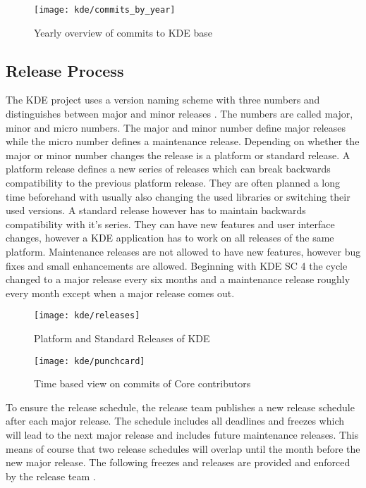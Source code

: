 \begin{figure}[htbp]
  \centering
  \texttt{[image: kde/commits\_by\_year]}
  \caption{Yearly overview of commits to KDE base}
\end{figure}


\subsection{Release Process} %

The KDE project uses a version naming scheme with three numbers and
distinguishes between major and minor releases
\cite{KDEReleaseTeam,KDEReleaseSchedule,KDESchedule}. The numbers are called
major, minor and micro numbers. The major and minor number define major
releases while the micro number defines a maintenance release. Depending on
whether the major or minor number changes the release is a platform or standard
release. A platform release defines a new series of releases which can break
backwards compatibility to the previous platform release. They are often
planned a long time beforehand with usually also changing the used libraries or
switching their used versions. A standard release however has to maintain
backwards compatibility with it's series. They can have new features and user
interface changes, however a KDE application has to work on all releases of the
same platform. Maintenance releases are not allowed to have new features,
however bug fixes and small enhancements are allowed. Beginning with \ac{KDE
SC} 4 the cycle changed to a major release every six months and a maintenance
release roughly every month except when a major release comes out.

\begin{figure}[htbp]
  \centering
  \texttt{[image: kde/releases]}
  \caption{Platform and Standard Releases of KDE}
\end{figure}

\begin{figure}[htbp]
  \centering
  \texttt{[image: kde/punchcard]}
  \caption{Time based view on commits of Core contributors}
\end{figure}

To ensure the release schedule, the release team publishes a new release
schedule after each major release. The schedule includes all deadlines and
freezes which will lead to the next major release and includes future
maintenance releases. This means of course that two release schedules will
overlap until the month before the new major release. The following freezes and
releases are provided and enforced by the release team
\cite{KDEReleaseSchedule}.

